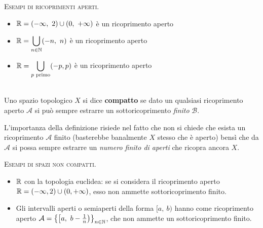 \begin{examples}\textsc{Esempi di ricoprimenti aperti.}
	\begin{itemize}
		\item $\displaystyle \realset=(-\infty ,\ 2)\cup(0,\ +\infty)$ è un ricoprimento aperto
		\item $\displaystyle \mathbb{R} =\bigcup_{n\in\mathbb{N}}(-n,\ n)$ è un ricoprimento aperto
		\item $\displaystyle \mathbb{R}=\bigcup_{p \text{ primo}}(-p,p)$ è un ricoprimento aperto
	\end{itemize}
\end{examples}

\begin{define}~{}\\
	Uno spazio topologico $X$ si dice \textbf{compatto} se dato un qualsiasi ricoprimento aperto $\mathcal{A}$ si può sempre estrarre un sottoricoprimento \textit{finito} $\mathcal{B}$.
\end{define}
L'importanza della definizione risiede nel fatto che non si chiede che esista un ricoprimento $\mathcal{A}$ finito (basterebbe banalmente $X$ stesso che è aperto) bensì che da $\mathcal{A}$ si possa sempre estrarre un \textit{numero finito di aperti} che ricopra ancora $X$.

\begin{examples}\textsc{Esempi di spazi non compatti.}
	\begin{itemize}
		\item $\mathbb{R}$ con la topologia euclidea: se si considera il ricoprimento aperto $\displaystyle \mathbb{R}=(-\infty , 2)\cup(0,+\infty)$, esso non ammette sottoricoprimento finito.
		\item Gli intervalli aperti o semiaperti della forma $[a,\ b)$ hanno come ricoprimento aperto $\mathcal{A}=\left\{ \left[ a, \ b-\frac{1}{n}\right) \right\}_{n\in \naturalset}$, che non ammette un sottoricoprimento finito.
	\end{itemize}
\end{examples}

